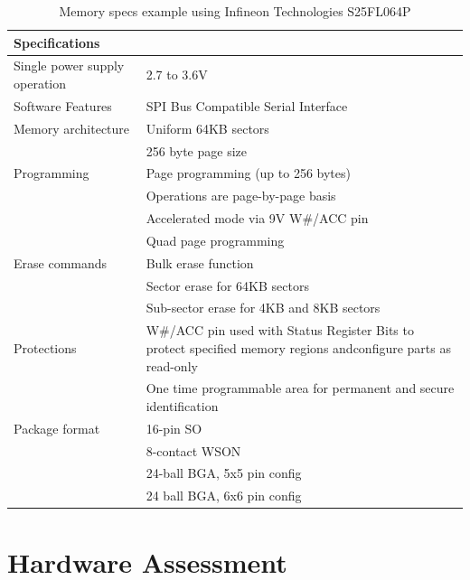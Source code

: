 \begin{table}[H]
  \centering
  \begin{tabular}{|p{6cm}|p{9cm}|}
    \hline\rowcolor{gray!30}

    \textbf{Specifications} &  \\
    \hline

    Single power supply operation & 2.7 to 3.6V \\
    \hline

    Software Features & SPI Bus Compatible Serial Interface \\
    \hline

    Memory architecture & Uniform 64KB sectors \\
    & 256 byte page size \\
    \hline

    Programming & Page programming (up to 256 bytes) \\
    & Operations are page-by-page basis \\
    & Accelerated mode via 9V W\#/ACC pin \\
    & Quad page programming \\
    \hline

    Erase commands & Bulk erase function \\
     & Sector erase for 64KB sectors \\
     & Sub-sector erase for 4KB and 8KB sectors \\
    \hline

    Protections & W\#/ACC pin used with Status Register Bits to protect specified memory regions andconfigure parts as read-only \\
    & One time programmable area for permanent and secure identification \\
    \hline

    Package format & 16-pin SO \\
    & 8-contact WSON \\
    & 24-ball BGA, 5x5 pin config \\
    & 24 ball BGA, 6x6 pin config \\
    \hline

  \end{tabular}
  \caption{Memory specs example using Infineon Technologies S25FL064P \autocite{S25FL064PSeriesFlash}}
  \label{fig:memory_specs}%
\end{table}

\section{Hardware Assessment} \label{hardwareassessment}

